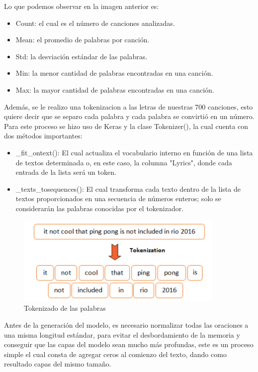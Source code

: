 \documentclass[12pt, a4paper, titlepage]{article}
\begin{document}
	Lo que podemos observar en la imagen anterior es:
	\begin{itemize}
		\item Count: el cual es el número de canciones analizadas.
		\item Mean: el promedio de palabras por canción.
		\item Std: la desviación estándar de las palabras.
		\item Min: la menor cantidad de palabras encontradas en una canción.
		\item Max: la mayor cantidad de palabras encontradas en una canción.
	\end{itemize}
	Además, se le realizo una tokenizacion a las letras de nuestras 700 canciones, esto quiere decir que se separo cada palabra y cada palabra se convirtió en un número. Para este proceso se hizo uso de Keras y la clase Tokenizer(), la cual cuenta con dos métodos importantes:
	\begin{itemize}
		\item \_fit\_ontext(): El cual actualiza el vocabulario interno en función de una lista de textos determinada o, en este caso, la columna "Lyrics", donde cada entrada de la lista será un token.
		\item \_texts\_tosequences(): El cual transforma cada texto dentro de la lista de textos proporcionados en una secuencia de números enteros; solo se considerarán las palabras conocidas por el tokenizador.
	\end{itemize}	
	\begin{figure}[H]
		\includegraphics[width=10cm]{./Imagenes/Modelo/tokenization.png}
		\centering 
		\caption{Tokenizado de las palabras \cite{tokenimagen}}
	\end{figure}
	Antes de la generación del modelo, es necesario normalizar todas las oraciones a una misma longitud estándar, para evitar el desbordamiento de la memoria y conseguir que las capas del modelo sean mucho más profundas, este es un proceso simple el cual consta de agregar ceros al comienzo del texto, dando como resultado capas del mismo tamaño.\\\\
\end{document}
